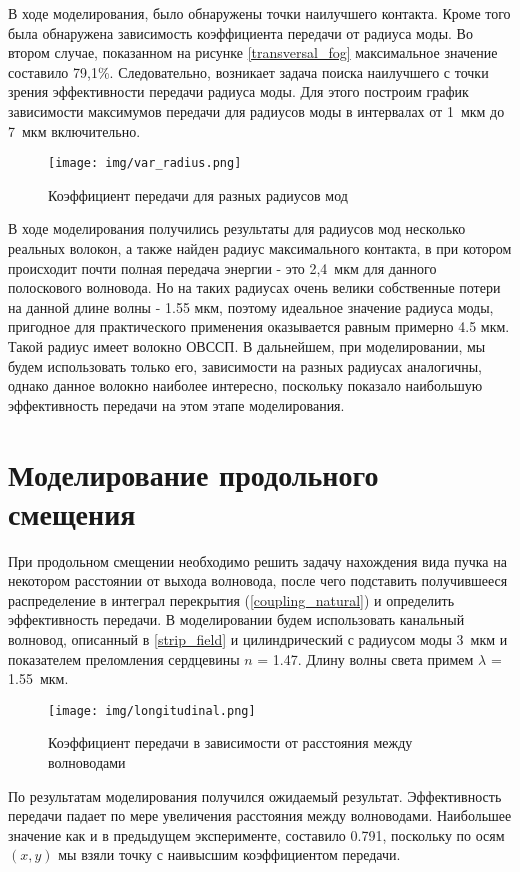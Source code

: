В ходе моделирования, было обнаружены точки наилучшего контакта. Кроме того была обнаружена зависимость коэффициента передачи от радиуса моды. Во втором случае, показанном на рисунке \ref{transversal_fog} максимальное значение составило 79,1\%. Следовательно, возникает задача поиска наилучшего с точки зрения эффективности передачи радиуса моды. Для этого построим график зависимости максимумов передачи для радиусов моды в интервалах от 1~мкм до 7~мкм включительно.
\begin{figure}[h!]
		\texttt{[image: img/var\_radius.png]}
		\caption{Коэффициент передачи для разных радиусов мод}
\end{figure}

В ходе моделирования получились результаты для радиусов мод несколько реальных волокон, а также найден радиус максимального контакта, в при котором происходит почти полная передача энергии - это 2,4~мкм для данного полоскового волновода. Но на таких радиусах очень велики собственные потери на данной длине волны - 1.55 мкм, поэтому идеальное значение радиуса моды, пригодное для практического применения оказывается равным примерно 4.5 мкм. Такой радиус имеет волокно ОВССП. В дальнейшем, при моделировании, мы будем использовать только его, зависимости на разных радиусах аналогичны, однако данное волокно наиболее интересно, поскольку показало наибольшую эффективность передачи на этом этапе моделирования.

\section{Моделирование продольного смещения}

При продольном смещении необходимо решить задачу нахождения вида пучка на некотором расстоянии от выхода волновода, после чего подставить получившееся распределение в интеграл перекрытия (\ref{coupling_natural}) и определить эффективность передачи.
В моделировании будем использовать канальный волновод, описанный в \ref{strip_field} и цилиндрический с радиусом моды 3~мкм и показателем преломления сердцевины $n$ = 1.47. Длину волны света примем $\lambda$ = 1.55~мкм.

\begin{figure}[h!]
	\texttt{[image: img/longitudinal.png]}
	\caption{Коэффициент передачи в зависимости от расстояния между волноводами}
	\label{longitudinal}
\end{figure}

По результатам моделирования получился ожидаемый результат. Эффективность передачи падает по мере увеличения расстояния между волноводами. Наибольшее значение как и в предыдущем эксперименте, составило 0.791, поскольку по осям $(x,y)$ мы взяли точку с наивысшим коэффициентом передачи.   

